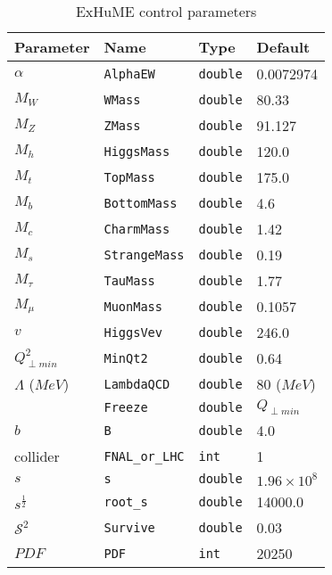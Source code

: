 \begin{table}[htdp]
\begin{center}
\begin{tabular}{| l | l | l | l |}%
\hline
\textbf{Parameter}&\textbf{Name}&\textbf{Type}&\textbf{Default}\\
\hline
$\alpha$&\texttt{AlphaEW}&\texttt{double}& 0.0072974\\
$M_{W}$&\texttt{WMass}&\texttt{double}& 80.33\\
$M_{Z}$&\texttt{ZMass}&\texttt{double}& 91.127\\
$M_{h}$&\texttt{HiggsMass}&\texttt{double}&120.0 \\
$M_{t}$&\texttt{TopMass}&\texttt{double}&175.0 \\
$M_{b}$&\texttt{BottomMass}&\texttt{double}& 4.6\\
$M_{c}$&\texttt{CharmMass}&\texttt{double}& 1.42\\
$M_{s}$&\texttt{StrangeMass}&\texttt{double}& 0.19\\
$M_{\tau}$&\texttt{TauMass}&\texttt{double}& 1.77\\
$M_{\mu}$&\texttt{MuonMass}&\texttt{double}& 0.1057\\
$v$&\texttt{HiggsVev}&\texttt{double}& 246.0\\
$Q_{\perp min}^{2}$&\texttt{MinQt2}&\texttt{double}& 0.64\\
$\Lambda$ ($MeV$)&\texttt{LambdaQCD}&\texttt{double}& 80 ($MeV$)\\
&\texttt{Freeze}&\texttt{double}& $Q_{\perp min}$\\
$b$&\texttt{B}&\texttt{double}& 4.0 \\
collider&\texttt{FNAL\_or\_LHC}&\texttt{int}& 1\\
$s$&\texttt{s}&\texttt{double}& $1.96\times 10^{8}$\\
$s^{\frac{1}{2}}$&\texttt{root\_s}&\texttt{double}& 14000.0\\
$\mathcal{S}^{2}$&\texttt{Survive}&\texttt{double}& 0.03\\
$PDF$&\texttt{PDF}&\texttt{int}& 20250\\
\hline

\end{tabular}
\end{center}
\caption{ExHuME control parameters}
\label{cards}
\end{table}

